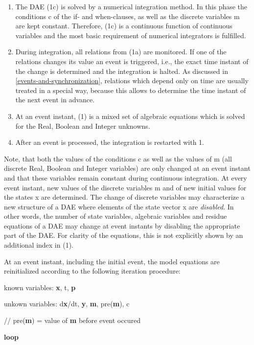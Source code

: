\documentclass[10pt,a4paper]{report}
\renewcommand{\labelenumi}{\arabic{enumi}.}
\begin{document}
\begin{enumerate}
\def\labelenumi{\arabic{enumi}.}
\item
  The DAE (1c) is solved by a numerical integration method. In this
  phase the conditions c of the if- and when-clauses, as well as the
  discrete variables m are kept constant. Therefore, (1c) is a
  continuous function of continuous variables and the most basic
  requirement of numerical integrators is fulfilled.
\item
  During integration, all relations from (1a) are monitored. If one of
  the relations changes its value an event is triggered, i.e., the exact
  time instant of the change is determined and the integration is
  halted. As discussed in \ref{events-and-synchronization}, relations which depend only on
  time are usually treated in a special way, because this allows to
  determine the time instant of the next event in advance.
\item
  At an event instant, (1) is a mixed set of algebraic equations which
  is solved for the Real, Boolean and Integer unknowns.
\item
  After an event is processed, the integration is restarted with 1.
\end{enumerate}

Note, that both the values of the conditions c as well as the values of
m (all discrete Real, Boolean and Integer variables) are only changed at
an event instant and that these variables remain constant during
continuous integration. At every event instant, new values of the
discrete variables m and of new initial values for the states x are
determined. The change of discrete variables may characterize a new
structure of a DAE where elements of the state vector x are
\emph{disabled}. In other words, the number of state variables,
algebraic variables and residue equations of a DAE may change at event
instants by disabling the appropriate part of the DAE. For clarity of
the equations, this is not explicitly shown by an additional index in
(1).

At an event instant, including the initial event, the model equations
are reinitialized according to the following iteration procedure:

known variables: \textbf{x}, t, \textbf{p}

unkown variables: d\textbf{x}/dt, \textbf{y}, \textbf{m},
pre(\textbf{m}), c

// pre(\textbf{m}) = value of \textbf{m} before event occured

\textbf{loop}
\end{document}
